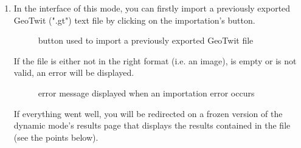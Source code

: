 \documentclass[a4paper,11pt]{report}
\begin{document}
\begin{enumerate}
	\item In the interface of this mode, you can firstly import a previously exported GeoTwit (".gt") text file by clicking on the importation's button.
	\begin{figure}[H]
	\vspace{-5pt}
	\begin{center}
	\vspace{-5pt}
	\caption{button used to import a previously exported GeoTwit file}
	\end{center}
	\end{figure}
	\vspace{-10pt}
	If the file is either not in the right format (i.e. an image), is empty or is not valid, an error will be displayed.
	\begin{figure}[H]
	\vspace{-5pt}
	\begin{center}
	\vspace{-5pt}
	\caption{error message displayed when an importation error occurs}
	\end{center}
	\end{figure}
	\vspace{-10pt}
	If everything went well, you will be redirected on a frozen version of the dynamic mode's results page that displays the results contained in the file (see the points below).
	

\end{enumerate}
\end{document}
